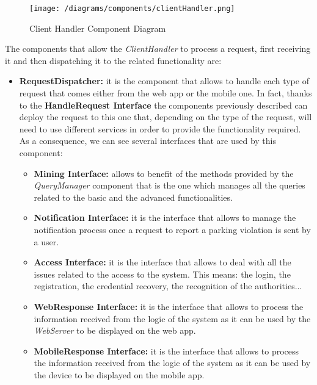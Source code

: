 			\begin{figure}[h!]
				\centering
				\texttt{[image: /diagrams/components/clientHandler.png]}
				\caption{\label{fig:clientHandlerComp} Client Handler Component Diagram}
			\end{figure}
			
			The components that allow the \emph{ClientHandler} to process a request, first receiving it and then dispatching it to the related functionality are:
			
			\begin{itemize}
				\item \textbf{RequestDispatcher:} it is the component that allows to handle each type of request that comes either from the web app or the mobile one. In fact, thanks to the \textbf{HandleRequest Interface} the components previously described can deploy the request to this one that, depending on the type of the request, will need to use different services in order to provide the functionality required. As a consequence, we can see several interfaces that are used by this component:
				
				\begin{itemize}
					\item \textbf{Mining Interface:} allows to benefit of the methods provided by the \emph{QueryManager} component that is the one which manages all the queries related to the basic and the advanced functionalities.
					
					\item \textbf{Notification Interface:} it is the interface that allows to manage the notification process once a request to report a parking violation is sent by a user.
					
					\item \textbf{Access Interface:} it is the interface that allows to deal with all the issues related to the access to the system. This means: the login, the registration, the credential recovery, the recognition of the authorities...
					
					\item \textbf{WebResponse Interface:} it is the interface that allows to process the information received from the logic of the system as it can be used by the \emph{WebServer} to be displayed on the web app.
					
					\item \textbf{MobileResponse Interface:} it is the interface that allows to process the information received from the logic of the system as it can be used by the device to be displayed on the mobile app.
				\end{itemize}
			\end{itemize}
		
